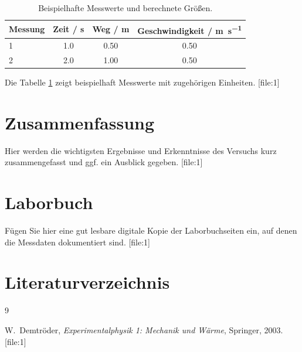 \documentclass[11pt,a4paper]{article}
\numberwithin{equation}{section}
\begin{document}
\begin{table}[h]
    \centering
    \caption{Beispielhafte Messwerte und berechnete Größen.}
    \label{tab:messwerte}
    \begin{tabular}{lccc}
        \toprule
        Messung & Zeit / \si{\second} & Weg / \si{\meter} & Geschwindigkeit / \si{\meter\per\second} \\
        \midrule
        1 & 1.0 & 0.50 & 0.50 \\
        2 & 2.0 & 1.00 & 0.50 \\
        \bottomrule
    \end{tabular}
\end{table}

Die Tabelle \ref{tab:messwerte} zeigt beispielhaft Messwerte mit zugehörigen Einheiten. [file:1]

\section{Zusammenfassung}

Hier werden die wichtigsten Ergebnisse und Erkenntnisse des Versuchs kurz zusammengefasst und ggf. ein Ausblick gegeben. [file:1]

\appendix
\section{Laborbuch}

Fügen Sie hier eine gut lesbare digitale Kopie der Laborbuchseiten ein, auf denen die Messdaten dokumentiert sind. [file:1]

\section{Literaturverzeichnis}

\begin{thebibliography}{9}

W.~Demtröder, \emph{Experimentalphysik 1: Mechanik und Wärme}, Springer, 2003. [file:1]


\end{thebibliography}
\end{document}
